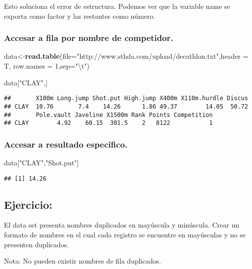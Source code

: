 \documentclass[]{article}
\newenvironment{Shaded}{\begin{snugshade}}{\end{snugshade}}
\newcommand{\KeywordTok}[1]{\textcolor[rgb]{0.13,0.29,0.53}{\textbf{#1}}}
\newcommand{\DataTypeTok}[1]{\textcolor[rgb]{0.13,0.29,0.53}{#1}}
\newcommand{\DecValTok}[1]{\textcolor[rgb]{0.00,0.00,0.81}{#1}}
\newcommand{\CharTok}[1]{\textcolor[rgb]{0.31,0.60,0.02}{#1}}
\newcommand{\StringTok}[1]{\textcolor[rgb]{0.31,0.60,0.02}{#1}}
\newcommand{\NormalTok}[1]{#1}
\begin{document}
Esto soluciona el error de estructura. Podemos ver que la variable name
se exporta como factor y las restantes como número.

\subsubsection{Accesar a fila por nombre de
competidor.}\label{accesar-a-fila-por-nombre-de-competidor.}

\begin{Shaded}
\begin{Highlighting}[]
\NormalTok{data<-}\KeywordTok{read.table}\NormalTok{(}\DataTypeTok{file=}\StringTok{"http://www.sthda.com/upload/decathlon.txt"}\NormalTok{,}\DataTypeTok{header =}\NormalTok{ T, }\DataTypeTok{row.names =} \DecValTok{1}\NormalTok{,}\DataTypeTok{sep=}\StringTok{"}\CharTok{\textbackslash{}t}\StringTok{"}\NormalTok{) }

\NormalTok{data[}\StringTok{"CLAY"}\NormalTok{,]}
\end{Highlighting}
\end{Shaded}

\begin{verbatim}
##       X100m Long.jump Shot.put High.jump X400m X110m.hurdle Discus
## CLAY  10.76       7.4    14.26      1.86 49.37        14.05  50.72
##       Pole.vault Javeline X1500m Rank Points Competition
## CLAY        4.92    60.15  301.5    2   8122           1
\end{verbatim}

\subsubsection{Accesar a resultado
específico.}\label{accesar-a-resultado-especifico.}

\begin{Shaded}
\begin{Highlighting}[]
\NormalTok{data[}\StringTok{"CLAY"}\NormalTok{,}\StringTok{"Shot.put"}\NormalTok{]}
\end{Highlighting}
\end{Shaded}

\begin{verbatim}
## [1] 14.26
\end{verbatim}

\subsection{Ejercicio:}\label{ejercicio}

El data set presenta nombres duplicados en mayúscula y minúscula. Crear
un formato de nombres en el cual cada registro se encuentre en
mayúsculas y no se presenten duplicados.

Nota: No pueden existir nombres de fila duplicados.
\end{document}
